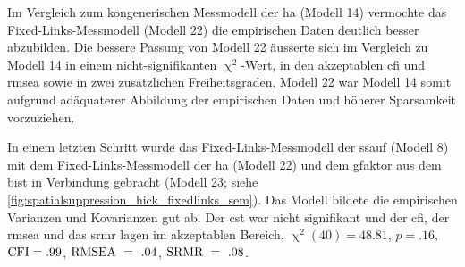 \documentclass[11pt, twoside, a4paper]{book}		%
\begin{document}
Im Vergleich zum kongenerischen Messmodell der \gls{ha} (Modell 14) vermochte das Fixed-Links-Messmodell (Modell 22) die empirischen Daten deutlich besser abzubilden. Die bessere Passung von Modell 22 äusserte sich im Vergleich zu Modell 14 in einem nicht-signifikanten $\upchi^2$-Wert, in den akzeptablen \gls{cfi} und \gls{rmsea} sowie in zwei zusätzlichen Freiheitsgraden. Modell 22 war Modell 14 somit aufgrund adäquaterer Abbildung der empirischen Daten und höherer Sparsamkeit vorzuziehen.

In einem letzten Schritt wurde das Fixed-Links-Messmodell der \gls{ssauf} (Modell 8) mit dem Fixed-Links-Messmodell der \gls{ha} (Modell 22) und dem \gls{gfaktor} aus dem \gls{bist} in Verbindung gebracht (Modell 23; siehe \autoref{fig:spatialsuppression_hick_fixedlinks_sem}). Das Modell bildete die empirischen Varianzen und Kovarianzen gut ab. Der \gls{cst} war nicht signifikant und der \gls{cfi}, der \gls{rmsea} und das \gls{srmr} lagen im akzeptablen Bereich, $\upchi^2(40)=48.81$, $p=.16$, $\textnormal{CFI}=.99$, $\textnormal{RMSEA}~=~.04$, $\textnormal{SRMR}~=~.08$.
\end{document}

